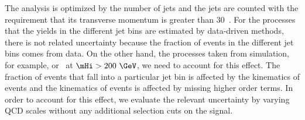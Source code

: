 The analysis is optimized by the number of jets and the jets are counted with the requirement that  
its transverse momentum is greater than 30~\GeV. For the processes that the yields in the 
different jet bins are estimated by data-driven methods, there is not related uncertainty 
because the fraction of events in the different jet bins comes from data. On the other hand, 
the processes taken from simulation, for example, \qqH or \qqww\ at $\mHi>200~\GeV$, 
we need to account for this effect.    
The fraction of events that fall into a particular jet bin is affected by the kinematics of events 
and the kinematics of events is affected by missing higher order terms. 
In order to account for this effect, we evaluate the relevant uncertainty by varying 
QCD scales without any additional selection cuts on the signal.

